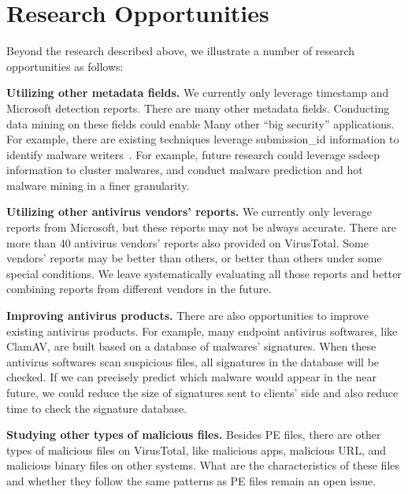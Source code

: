 \section{Research Opportunities}
\label{sec:oppo}
Beyond the research described above, we illustrate a number of research opportunities as follows: 

{\bf Utilizing other metadata fields.} 
We currently only leverage timestamp and Microsoft detection reports. 
There are many other metadata fields. 
Conducting data mining on these fields could enable 
Many other ``big security'' applications. 
For example, there are existing techniques leverage submission\_id information to identify malware writers~\cite{neeles}. 
For example, future research could leverage ssdeep information to cluster malwares, 
and conduct malware prediction and hot malware mining in a finer granularity. 

{\bf Utilizing other antivirus vendors’ reports.}
We currently only leverage reports from Microsoft, but these reports may not be always accurate.
There are more than 40 antivirus vendors' reports also provided on VirusTotal.
Some vendors’ reports may be better than others, or better than others under some special conditions. 
We leave systematically evaluating all those reports and better combining reports from different vendors in the future. 

{\bf Improving antivirus products.} 
There are also opportunities to improve existing antivirus products. 
For example, many endpoint antivirus softwares, like ClamAV, are built based on a database of malwares' signatures. 
When these antivirus softwares scan suspicious files, all signatures in the database will be checked. 
If we can precisely predict which malware would appear in the near future, 
we could reduce the size of signatures sent to clients' side and also reduce time to check the signature database. 

{\bf Studying other types of malicious files. }
Besides PE files, there are other types of malicious files on VirusTotal, like malicious apps, 
malicious URL, and malicious binary files on other systems. 
What are the characteristics of these files and whether they follow the same patterns as PE files remain an open issue.  